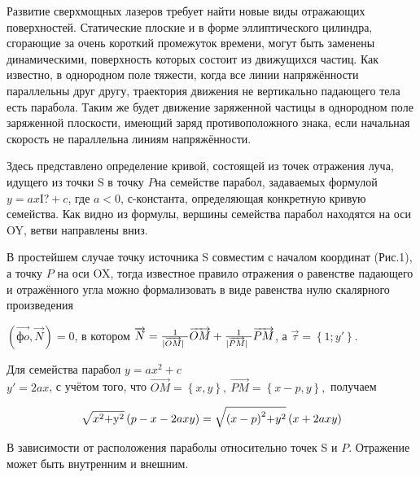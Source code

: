 



\vzmscaption

Развитие сверхмощных лазеров требует найти новые виды отражающих поверхностей. Статические плоские и в форме эллиптического цилиндра, сгорающие за очень короткий промежуток времени, могут быть заменены динамическими, поверхность которых состоит из движущихся частиц. Как известно, в однородном поле тяжести, когда все линии напряжённости параллельны друг другу, траектория движения не вертикально падающего тела есть парабола. Таким же будет движение заряженной частицы в однородном поле заряженной плоскости, имеющий заряд противоположного знака, если начальная скорость не параллельна линиям напряжённости.

Здесь представлено определение кривой, состоящей из точек отражения луча, идущего из точки S в точку $P$на семействе парабол, задаваемых формулой $y=axІ?+c$, где $a<0$, $с$-константа, определяющая конкретную кривую семейства. Как видно из формулы, вершины семейства парабол находятся на оси OY, ветви направлены вниз.

В простейшем случае точку источника S совместим с началом координат (Рис.1), а точку $P$ на оси OX, тогда известное правило отражения о равенстве падающего и отражённого угла можно формализовать в виде равенства нулю скалярного произведения

$(\overrightarrow{фo},\overrightarrow{N})=0$, в котором $\overrightarrow{N}=\frac{{\rm 1}}{|\overrightarrow{OM}|\ }\overrightarrow{OM}+\frac{{\rm 1}}{|\overrightarrow{PM}|\ }\overrightarrow{PM}$, а $\overrightarrow{\tau }=\left\{1;y'\right\}.$

Для семейства парабол $y=ax^2+c$\\
$y'=2ax$, с учётом того, что $\overrightarrow{OM}=\left\{x,y\right\},\ \overrightarrow{PM}=\left\{x-p,y\right\},$ получаем

\begin{equation} \label{GrindEQ__1_} \sqrt{x^{{\rm 2}}{\rm +}{{\rm y}}^{{\rm 2}}}\left(p-x-2axy\right)=\sqrt{(x-{p)}^{{\rm 2}}{\rm +}y^{{\rm 2}}}\left(x+2axy\right) \end{equation}

В зависимости от расположения параболы относительно точек S и $P$. Отражение может быть внутренним и внешним.

